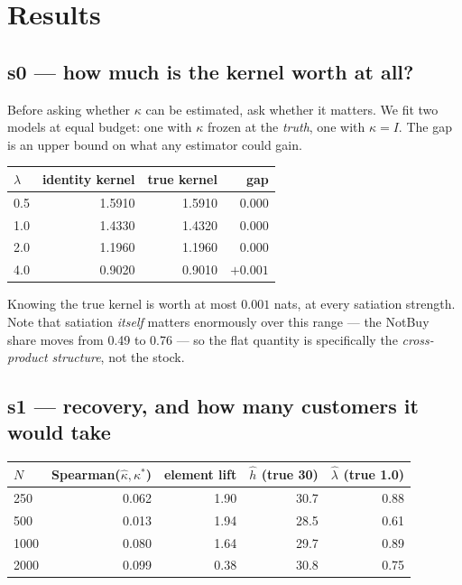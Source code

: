 \documentclass[11pt]{article}
\begin{document}
\section{Results}

\subsection{s0 --- how much is the kernel worth at all?}

Before asking whether $\kappa$ can be estimated, ask whether it matters. We fit
two models at equal budget: one with $\kappa$ frozen at the \emph{truth}, one
with $\kappa = I$. The gap is an upper bound on what any estimator could gain.

\begin{center}\small
\begin{tabular}{lrrr}
\toprule
$\lambda$ & identity kernel & true kernel & gap \\
\midrule
0.5 & 1.5910 & 1.5910 & $0.000$ \\
1.0 & 1.4330 & 1.4320 & $0.000$ \\
2.0 & 1.1960 & 1.1960 & $0.000$ \\
4.0 & 0.9020 & 0.9010 & $+0.001$ \\
\bottomrule
\end{tabular}
\end{center}

\noindent Knowing the true kernel is worth at most $0.001$ nats, at every
satiation strength. Note that satiation \emph{itself} matters enormously over
this range --- the NotBuy share moves from 0.49 to 0.76 --- so the flat quantity
is specifically the \emph{cross-product structure}, not the stock.

\subsection{s1 --- recovery, and how many customers it would take}

\begin{center}\small
\begin{tabular}{lrrrr}
\toprule
$N$ & Spearman($\hat\kappa,\kappa^{*}$) & element lift & $\hat h$ (true 30) & $\hat\lambda$ (true 1.0) \\
\midrule
250 & 0.062 & 1.90 & 30.7 & 0.88 \\
500 & 0.013 & 1.94 & 28.5 & 0.61 \\
1000 & 0.080 & 1.64 & 29.7 & 0.89 \\
2000 & 0.099 & 0.38 & 30.8 & 0.75 \\
\bottomrule
\end{tabular}
\end{center}
\end{document}

